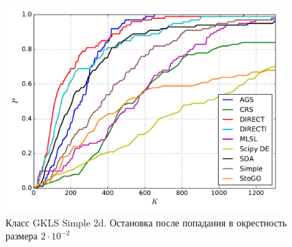 \documentclass[a4paper]{article}
\begin{document}
\begin{figure}[H]
  \center
  \includegraphics[width=0.95\textwidth]{../experiments/gklss2d/cmc.pdf}
  \caption{Класс GKLS Simple 2d. Остановка после попадания в окрестность размера $2\cdot10^{-2}$}
  \label{fig:}
\end{figure}
\end{document}
